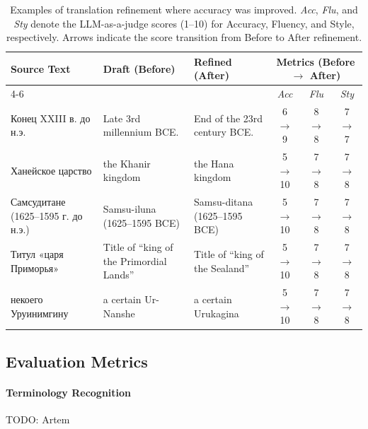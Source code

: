 \documentclass[11pt]{article}
\begin{document}
\begin{table}[t!]
\centering
\small
\renewcommand{\arraystretch}{1.2}
\begin{tabular}{p{3cm} p{3.75cm} p{4.5cm} c c c}
\toprule
\textbf{Source Text} & \textbf{Draft (Before)} & \textbf{Refined (After)} & \multicolumn{3}{c}{\textbf{Metrics (Before $\rightarrow$ After)}} \\
\cmidrule(lr){4-6}
& & & \textit{Acc} & \textit{Flu} & \textit{Sty} \\
\midrule

Конец XXIII в. до н.э. & Late 3rd millennium BCE. & End of the 23rd century BCE. &
6 $\rightarrow$ 9 & 8 $\rightarrow$ 8 & 7 $\rightarrow$ 7 \\

\midrule

Ханейское царство &
the Khanir kingdom & 
the Hana kingdom & 
5 $\rightarrow$ 10 & 7 $\rightarrow$ 8 & 7 $\rightarrow$ 8 \\

\midrule

Самсудитане (1625–1595 г. до н.э.) &
Samsu-iluna (1625–1595 BCE) &
Samsu-ditana (1625–1595 BCE) & 
5 $\rightarrow$ 10 & 7 $\rightarrow$ 8 & 7 $\rightarrow$ 8 \\

\midrule

Титул «царя Приморья» &
Title of “king of the Primordial Lands” & 
Title of “king of the Sealand” &
5 $\rightarrow$ 10 & 7 $\rightarrow$ 8 & 7 $\rightarrow$ 8 \\

\midrule

некоего Уруинимгину &
a certain Ur-Nanshe & 
a certain Urukagina &
5 $\rightarrow$ 10 & 7 $\rightarrow$ 8 & 7 $\rightarrow$ 8 \\

\bottomrule
\end{tabular}
\caption{Examples of translation refinement where accuracy was improved. \textit{Acc}, \textit{Flu}, and \textit{Sty} denote the LLM-as-a-judge scores (1--10) for Accuracy, Fluency, and Style, respectively. Arrows indicate the score transition from Before to After refinement.}
\label{tab:refinement_examples}
\end{table}


\subsection{Evaluation Metrics}

\paragraph{Terminology Recognition} TODO: Artem
\end{document}
